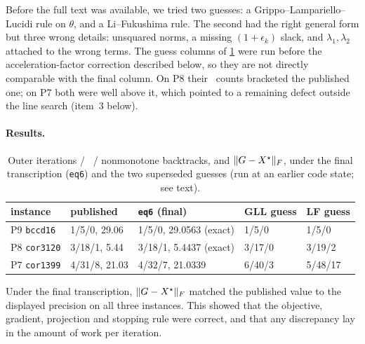 Before the full text was available, we tried two guesses: a
Grippo--Lampariello--Lucidi rule on $\theta$, and a Li--Fukushima rule. The
second had the right general form but three wrong details: unsquared norms, a
missing $(1+\epsilon_k)$ slack, and $\lambda_1,\lambda_2$ attached to the
wrong terms. The guess columns of \cref{tab:agd-full} were run before the
acceleration-factor correction described below, so they are not directly
comparable with the final column. On P8 their \EVD\ counts bracketed the
published one; on P7 both were well above it, which pointed to a remaining
defect outside the line search (item~3 below).

\paragraph{Results.}
\begin{table}[h]
\centering
\caption{Outer iterations / \EVDs\ / nonmonotone backtracks, and
$\lVert G-X^\star\rVert_F$, under the final transcription (\texttt{eq6}) and the two
superseded guesses (run at an earlier code state; see text).}
\label{tab:agd-full}
\small
\begin{tabular}{lllll}
\toprule
instance & published & \texttt{eq6} (final) & GLL guess & LF guess\\
\midrule
P9 \texttt{bccd16}  & 1/5/0, 29.06  & 1/5/0, 29.0563 (exact) & 1/5/0 & 1/5/0\\
P8 \texttt{cor3120} & 3/18/1, 5.44  & 3/18/1, 5.4437 (exact) & 3/17/0 & 3/19/2\\
P7 \texttt{cor1399} & 4/31/8, 21.03 & 4/32/7, 21.0339 & 6/40/3 & 5/48/17\\
\bottomrule
\end{tabular}
\end{table}
Under the final transcription, $\lVert G-X^\star\rVert_F$ matched the published value to
the displayed precision on all three instances. This showed that the
objective, gradient, projection and stopping rule were correct, and that any
discrepancy lay in the amount of work per iteration.

